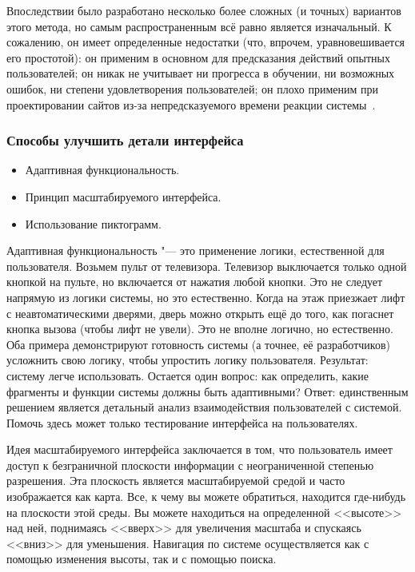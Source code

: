 \documentclass{../industrial-development}
\begin{document}
Впоследствии было разработано несколько более сложных (и точных) вариантов этого метода, но самым распространенным всё равно является изначальный. К сожалению, он имеет определенные недостатки (что, впрочем, уравновешивается его простотой): он применим в основном для предсказания действий опытных пользователей; он никак не учитывает ни прогресса в обучении, ни возможных ошибок, ни степени удовлетворения пользователей; он плохо применим при проектировании сайтов из-за непредсказуемого времени реакции системы~\cite[с.~120--121]{Golovach}.

\begin{frame} \frametitle{Способы улучшить детали интерфейса}
  \begin{itemize}
   \item Адаптивная функциональность.
   \item Принцип масштабируемого интерфейса.
   \item Использование пиктограмм.
  \end{itemize}
\end{frame}

\lecturenotes

Адаптивная функциональность "--- это применение логики, естественной для пользователя. Возьмем пульт от телевизора. Телевизор выключается только одной кнопкой на пульте, но включается от нажатия любой кнопки. Это не следует напрямую из логики системы, но это естественно. Когда на этаж приезжает лифт с неавтоматическими дверями, дверь можно открыть ещё до того, как погаснет кнопка вызова (чтобы лифт не увели). Это не вполне логично, но естественно. Оба примера демонстрируют готовность системы (а точнее, её разработчиков) усложнить свою логику, чтобы упростить логику пользователя. Результат: систему легче использовать. Остается один вопрос: как определить, какие фрагменты и функции системы должны быть адаптивными? Ответ: единственным решением является детальный анализ взаимодействия пользователей с системой. Помочь здесь может только тестирование интерфейса на пользователях.~\cite[с.~124]{Golovach}

Идея масштабируемого интерфейса заключается в том, что пользователь имеет доступ к безграничной плоскости информации с неограниченной степенью разрешения. Эта плоскость является масштабируемой средой и часто изображается как карта. Все, к чему вы можете обратиться, находится где-нибудь на плоскости этой среды. Вы можете находиться на определенной <<высоте>> над ней, поднимаясь <<вверх>> для увеличения масштаба и спускаясь <<вниз>> для уменьшения. Навигация по системе осуществляется как с помощью изменения высоты, так и с помощью поиска.
\end{document}
